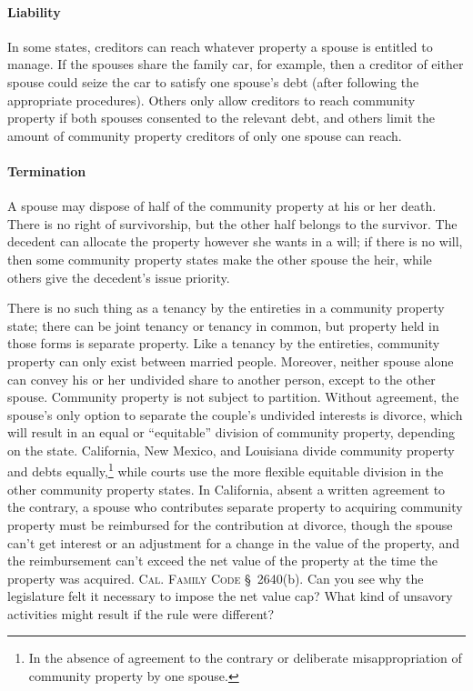 \paragraph{Liability}
In some states, creditors can reach whatever property a spouse is entitled to
manage. If the spouses share the family car, for example, then a creditor of
either spouse could seize the car to satisfy one spouse's debt (after following
the appropriate procedures). Others only allow creditors to reach community
property if both spouses consented to the relevant debt, and others limit the
amount of community property creditors of only one spouse can reach.

\paragraph{Termination}
A spouse may dispose of half of the community property at his or her death.
There is no right of survivorship, but the other half belongs to the survivor.
The decedent can allocate the property however she wants in a will; if there is
no will, then some community property states make the other spouse the heir,
while others give the decedent's issue priority.

There is no such thing as a tenancy by the entireties in a community property
state; there can be joint tenancy or tenancy in common, but property held in
those forms is separate property. Like a tenancy by the entireties, community
property can only exist between married people. Moreover, neither spouse alone
can convey his or her undivided share to another person, except to the other
spouse. Community property is not subject to partition. Without agreement,
the spouse's only option to separate the couple's undivided interests is
divorce, which will result in an equal or ``equitable'' division of community
property, depending on the state. California, New Mexico, and Louisiana divide
community property and debts equally,\footnote{In the absence of agreement to
the contrary or deliberate misappropriation of community property by one
spouse.} while courts use the more flexible equitable division in the other
community property states. In California, absent a written agreement to the
contrary, a spouse who contributes separate property to acquiring community
property must be reimbursed for the contribution at divorce, though the spouse
can't get interest or an adjustment for a change in the value of the property,
and the reimbursement can't exceed the net value of the property at the time
the property was acquired. \textsc{Cal. Family Code} \S~2640(b). Can you see why
the legislature felt it necessary to impose the net value cap? What kind of
unsavory activities might result if the rule were different?

